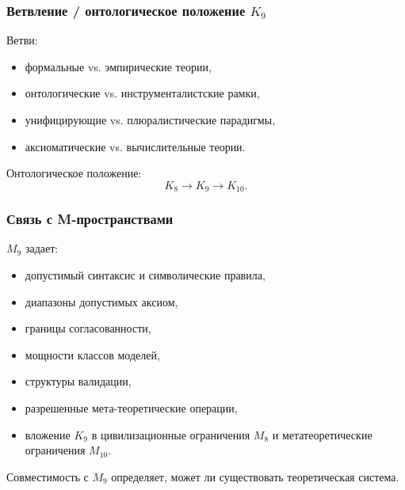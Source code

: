 \subsubsection{Ветвление / онтологическое положение \texorpdfstring{$K_9$}{K_9}}

Ветви:
\begin{itemize}
    \item формальные vs. эмпирические теории,
    \item онтологические vs. инструменталистские рамки,
    \item унифицирующие vs. плюралистические парадигмы,
    \item аксиоматические vs. вычислительные теории.
\end{itemize}

Онтологическое положение:
\[
K_8 \to K_9 \to K_{10}.
\]

\subsubsection{Связь с M-пространствами}

$M_9$ задает:
\begin{itemize}
    \item допустимый синтаксис и символические правила,
    \item диапазоны допустимых аксиом,
    \item границы согласованности,
    \item мощности классов моделей,
    \item структуры валидации,
    \item разрешенные мета-теоретические операции,
    \item вложение $K_9$ в цивилизационные ограничения $M_8$ и метатеоретические ограничения $M_{10}$.
\end{itemize}

Совместимость с $M_9$ определяет, может ли существовать теоретическая система.
